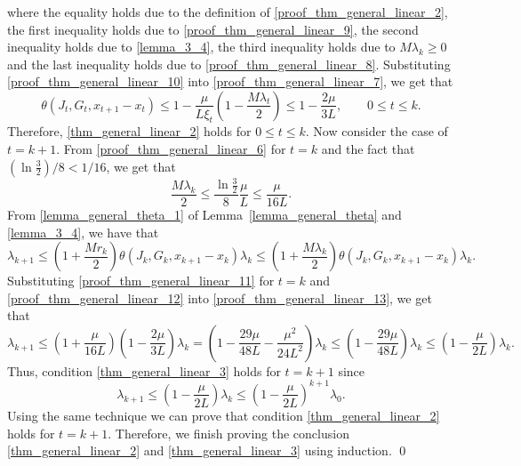\documentclass[11pt]{article}
\numberwithin{assumption}{section}
\numberwithin{remark}{section}
\numberwithin{theorem}{section}
\begin{document}
where the equality holds due to the definition of \eqref{proof_thm_general_linear_2}, the first inequality holds due to \eqref{proof_thm_general_linear_9}, the second inequality holds due to \eqref{lemma_3_4}, the third inequality holds due to $M\lambda_k \geq 0$ and the last inequality holds due to \eqref{proof_thm_general_linear_8}. Substituting \eqref{proof_thm_general_linear_10} into \eqref{proof_thm_general_linear_7}, we get that
\begin{equation}\label{proof_thm_general_linear_11}
    \theta(J_t, G_t, x_{t + 1} - x_{t}) \leq 1 - \frac{\mu}{L\xi_t}(1 - \frac{M\lambda_t}{2}) \leq 1 - \frac{2\mu}{3L}, \qquad 0 \leq t \leq k.
\end{equation}
Therefore, \eqref{thm_general_linear_2} holds for $0 \leq t \leq k$. Now consider the case of $t = k + 1$. From \eqref{proof_thm_general_linear_6} for $t = k$ and the fact that ${(\ln{\frac{3}{2}})}/{8} < {1}/{16}$, we get that
\begin{equation}\label{proof_thm_general_linear_12}
    \frac{M\lambda_k}{2} \leq \frac{\ln{\frac{3}{2}}}{8}\frac{\mu}{L} \leq \frac{\mu}{16L}.
\end{equation}
From \eqref{lemma_general_theta_1} of Lemma~\ref{lemma_general_theta} and \eqref{lemma_3_4}, we have that
\begin{equation}\label{proof_thm_general_linear_13}
    \lambda_{k + 1} \leq (1 + \frac{Mr_k}{2})\theta(J_k, G_k, x_{k + 1} - x_{k})\lambda_k \leq (1 + \frac{M\lambda_k}{2})\theta(J_k, G_k, x_{k + 1} - x_{k})\lambda_k.
\end{equation}
Substituting \eqref{proof_thm_general_linear_11} for $t = k$ and \eqref{proof_thm_general_linear_12} into \eqref{proof_thm_general_linear_13}, we get that
\begin{equation}
    \lambda_{k + 1} \leq (1 + \frac{\mu}{16L})(1 - \frac{2\mu}{3L})\lambda_k = (1 - \frac{29\mu}{48L} - \frac{\mu^2}{24L^2})\lambda_k \leq (1 - \frac{29\mu}{48L})\lambda_k \leq (1 - \frac{\mu}{2L})\lambda_k.
\end{equation}
Thus, condition \eqref{thm_general_linear_3} holds for $t = k + 1$ since
\begin{equation}
\lambda_{k + 1} \leq (1 - \frac{\mu}{2L})\lambda_k \leq (1 - \frac{\mu}{2L})^{k + 1}\lambda_0.
\end{equation}
Using the same technique we can prove that condition \eqref{thm_general_linear_2} holds for $t = k + 1$. Therefore, we finish proving the conclusion \eqref{thm_general_linear_2} and \eqref{thm_general_linear_3} using induction. \hfill \qed
\end{document}
